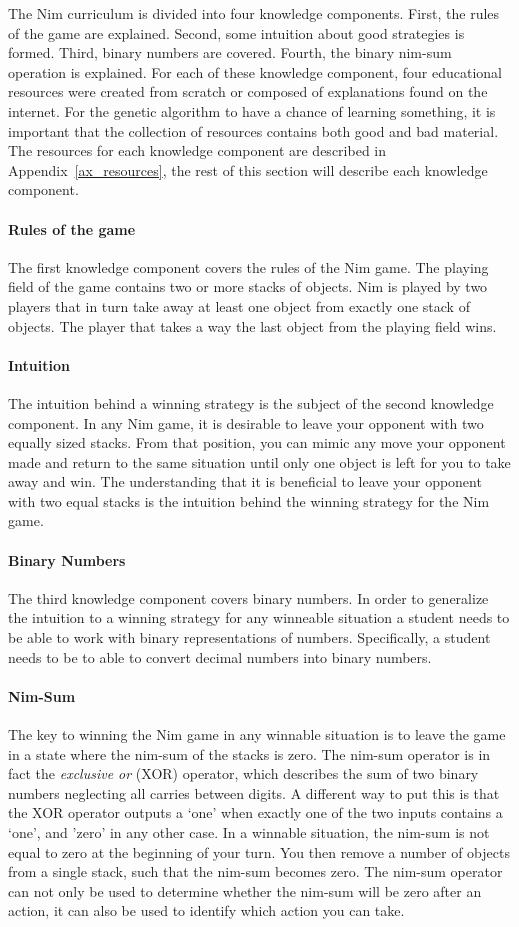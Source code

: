 The Nim curriculum is divided into four knowledge components. First, the rules
of the game are explained. Second, some intuition about good strategies is formed.
Third, binary numbers are covered. Fourth, the binary nim-sum operation is
explained. For each of these knowledge component, four educational resources
were created from scratch or composed of explanations found on the internet.
For the genetic algorithm to have a chance of learning something, it is
important that the collection of resources contains both good and bad material.
The resources for each knowledge component are described in
Appendix~\ref{ax_resources}, the rest of this section will describe
each knowledge component.
\paragraph{Rules of the game} The first knowledge component covers the rules
of the Nim game. The playing field of the game contains two or more stacks of
objects. Nim is played by two players that in turn take away at least
one object from exactly one stack of objects. The player that takes a way the
last object from the playing field wins.
\paragraph{Intuition} The intuition behind a winning strategy is the subject
of the second knowledge component. In any Nim game, it is desirable to leave
your opponent with two equally sized stacks. From that position, you can mimic
any move your opponent made and return to the same situation until only one
object is left for you to take away and win. The understanding that it is
beneficial to leave your opponent with two equal stacks is the intuition behind
the winning strategy for the Nim game.
\paragraph{Binary Numbers} The third knowledge component covers binary numbers.
In order to generalize the intuition to a winning strategy
for any winneable situation a student needs to be able to work with binary
representations of numbers. Specifically, a student needs to be to able to
convert decimal numbers into binary numbers.
\paragraph{Nim-Sum}
The key to winning the Nim game in any winnable situation is to leave the game
in a state where the nim-sum of the stacks is zero. The nim-sum operator is in
fact the \emph{exclusive or} (XOR) operator, which describes the sum of two
binary numbers neglecting all carries between digits. A different way to put
this is that the XOR operator outputs a `one' when exactly one of the two
inputs contains a `one', and 'zero' in any other case. In a winnable situation,
the nim-sum is not equal to zero at the beginning of your turn. You then remove a
number of objects from a single stack, such that the nim-sum becomes zero.
The nim-sum operator can not only be used to determine whether the nim-sum will
be zero after an action, it can also be used to identify which action you can take.

